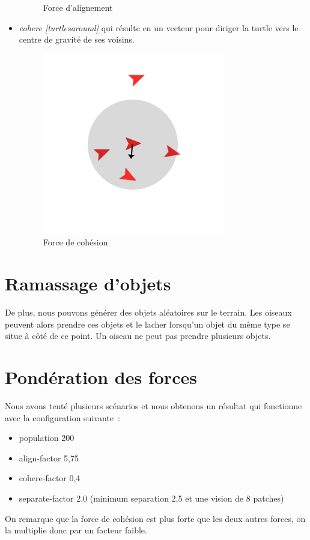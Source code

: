 \documentclass{article}
\begin{document}
\begin{itemize}
\begin{figure}[h]
\begin{center}
  		\caption{Force d'alignement}
  		\label{fig:align}
  	\end{center}
  \end{figure}
  \item \emph{cohere [turtlesaround]} qui résulte en un vecteur pour diriger la turtle vers le centre de gravité de ses voisins.
  \begin{figure}[h]
  	\begin{center}
  		\includegraphics[scale=0.3]{img/cohere}
  		\caption{Force de cohésion}
  		\label{fig:cohere}
  	\end{center}
  \end{figure}
\end{itemize}

\section{Ramassage d'objets}

De plus, nous pouvons générer des objets aléatoires sur le terrain. Les oiseaux peuvent alors prendre ces objets et le lacher lorsqu'un objet du même type se situe à côté de ce point. Un oiseau ne peut pas prendre plusieurs objets.

\section{Pondération des forces}

Nous avons tenté plusieurs scénarios et nous obtenons un résultat qui fonctionne avec la configuration suivante~:
\begin{itemize}
  \item population 200
  \item align-factor 5,75
  \item cohere-factor 0,4
  \item separate-factor 2,0 (minimum separation 2,5 et une vision de 8 patches)
\end{itemize}
On remarque que la force de cohésion est plus forte que les deux autres forces, on la multiplie donc par un facteur faible.
\end{document}
